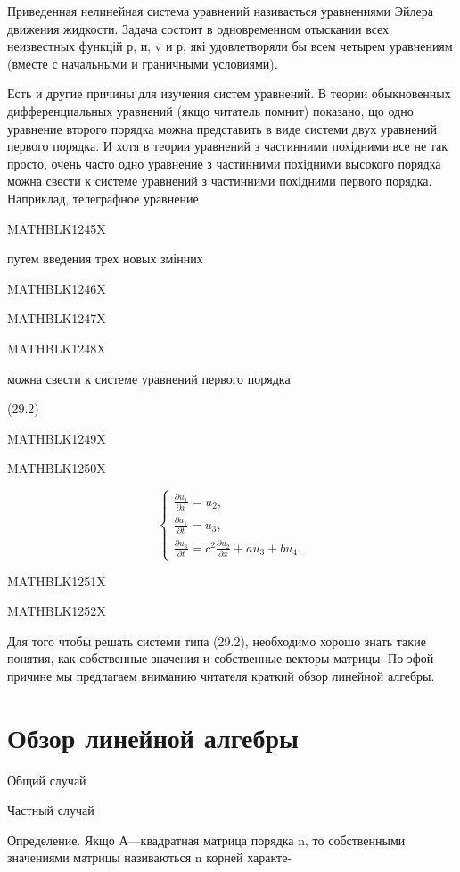 \documentclass[
  ukrainian,
]{article}
\begin{document}
Приведенная нелинейная система уравнений називається уравнениями Эйлера
движения жидкости. Задача состоит в одновременном отыскании всех
неизвестных функцій р, и, v и р, які удовлетворяли бы всем четырем
уравнениям (вместе с начальными и граничными условиями).

Есть и другие причины для изучения систем уравнений. В теории
обыкновенных дифференциальных уравнений (якщо читатель помнит) показано,
що одно уравнение второго порядка можна представить в виде системи двух
уравнений первого порядка. И хотя в теории уравнений з частинними
похідними все не так просто, очень часто одно уравнение з частинними
похідними высокого порядка можна свести к системе уравнений з частинними
похідними первого порядка. Наприклад, телеграфное уравнение

MATHBLK1245X

путем введения трех новых змінних

MATHBLK1246X

MATHBLK1247X

MATHBLK1248X

можна свести к системе уравнений первого порядка

(29.2)

MATHBLK1249X

MATHBLK1250X

\[
\begin{cases} \frac{\partial u_1}{\partial x} = u_2, \\ \frac{\partial a_1}{\partial t} = u_3, \\ \frac{\partial u_3}{\partial t} = c^2 \frac{\partial u_2}{\partial x} + au_3 + bu_4. \end{cases}
\]

MATHBLK1251X

MATHBLK1252X

Для того чтобы решать системи типа (29.2), необходимо хорошо знать такие
понятия, как собственные значения и собственные векторы матрицы. По эфой
причине мы предлагаем вниманию читателя краткий обзор линейной алгебры.

\section{Обзор линейной
алгебры}\label{ux43eux431ux437ux43eux440-ux43bux438ux43dux435ux439ux43dux43eux439-ux430ux43bux433ux435ux431ux440ux44b}

Общий случай

Частный случай

Определение. Якщо А---квадратная матрица порядка n, то собственными
значениями матрицы називаються n корней характе-
\end{document}
